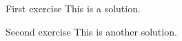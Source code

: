 \begin{Soln}{First exercise}
         This is a solution.
         \relax{}
      
\end{Soln}
\begin{Soln}{Second exercise}
         This is another solution.
      
\end{Soln}
